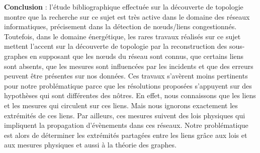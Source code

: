 \newline
{\bf Conclusion} :
l'\'etude bibliographique effectu\'ee sur la d\'ecouverte de topologie montre que la recherche sur ce sujet  est tr\`es active dans le domaine des r\'eseaux informatiques, pr\'ecisement dans la d\'etection de n\oe uds/liens congestionn\'es. 
Toutefois, dans le domaine \'energ\'etique, les rares travaux r\'ealis\'es sur ce sujet mettent l'accent sur la d\'ecouverte de topologie par la reconstruction des sous-graphes en supposant que les n\oe uds du r\'eseau sont connus, 
que certains liens sont absents, 
que les mesures sont influenc\'ees par les incidents 
et que des erreurs peuvent \^etre pr\'esentes sur nos donn\'ees. 
Ces travaux s'av\`erent moins pertinents pour notre probl\'ematique parce  que les r\'esolutions propos\'ees s'appuyent sur des hypoth\`eses qui sont diff\'erentes des n\^otres. 
En effet, nous connaissons que les liens et les mesures qui circulent sur ces liens. 
Mais nous ignorons exactement les extr\'emit\'es de ces liens.
Par ailleurs, ces mesures suivent  des lois physiques qui impliquent la propagation d'\'ev\`enements dans ces r\'eseaux.
Notre probl\'ematique est alors de d\'eterminer les extr\'emit\'es partag\'ees entre les liens  gr\^ace aux lois et aux mesures physiques et aussi \`a la th\'eorie des graphes.


